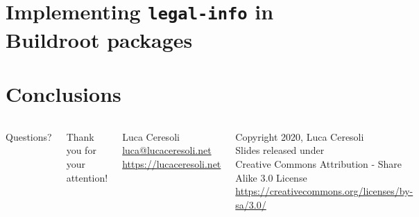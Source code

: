 \documentclass[xetex,table]{beamer}
\begin{document}
\section[Implementing {\tt legal-info}\\in Buildroot packages]
        {Implementing {\tt legal-info}  in Buildroot packages}


\section{Conclusions}

\begin{frame}
  \begin{columns}
    \center

    {\Huge Questions?}

    \center

    {\Large Thank you for your attention!}

    \vspace{0.15\textheight}

    {\Large Luca Ceresoli}\\
    \href{mailto:luca@lucaceresoli.net}{luca@lucaceresoli.net}\\
    \url{https://lucaceresoli.net}

    \vspace{0.05\textheight}

    \tiny
    \textcopyright{} Copyright 2020, Luca Ceresoli\\
    Slides released under\\
    Creative Commons Attribution - Share Alike 3.0 License \\
    \url{https://creativecommons.org/licenses/by-sa/3.0/} \\
\end{columns}
\end{frame}
\end{document}

